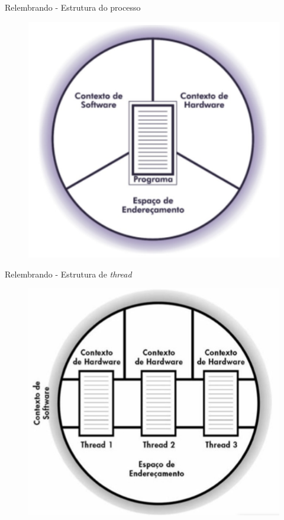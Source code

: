 \documentclass[aspectratio=169,
				xcolor=table]{beamer}
\begin{document}
	\begin{frame}{Relembrando - Estrutura do processo}	
		\begin{figure}[hbtp]
		\centering
		\includegraphics[keepaspectratio, height=.8\textheight]{../figs/cap03/estrutura.png}
		\end{figure}
	\end{frame}	
	
	\begin{frame}{Relembrando - Estrutura de \textit{thread}}
		\begin{figure}[hbtp]
			\centering
			\includegraphics[height=.85\textheight, keepaspectratio]{../figs/cap04/multithread02.png}
		\end{figure}	
	\end{frame}	
	
\end{document}
